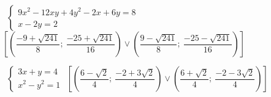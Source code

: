 \begin{esercizio}[\Ast]
\begin{enumeratea}
\item~\(\left\{\begin{array}{l}9x^2-12xy+4y^2-2x+6y=8\\x-2y=2\end{array}
\right.\)
\hfill\(\left[\left(\dfrac{-9+\sqrt{241}} 
8;~\dfrac{-25+\sqrt{241}}{16}\right)\vee 
\left(\dfrac{9-\sqrt{241}} 8;~\dfrac{-25-\sqrt{241}}{16}\right)\right]\)
 \item~\(\left\{\begin{array}{l}3x+y=4\\x^2-y^2=1\end{array}\right.\)
\hfill\(\left[\left(\dfrac{6-\sqrt 2} 4;~\dfrac{-2+3\sqrt 2} 4\right)\vee 
\left(\dfrac{6+\sqrt 2} 4;~\dfrac{-2-3\sqrt 2} 4\right)\right]\)
 \end{enumeratea}
\end{esercizio}

